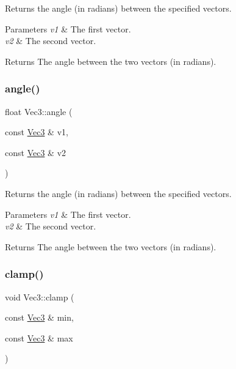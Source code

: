 Returns the angle (in radians) between the specified vectors.


\begin{DoxyParams}{Parameters}
{\em v1} & The first vector. \\
\hline
{\em v2} & The second vector.\\
\hline
\end{DoxyParams}
\begin{DoxyReturn}{Returns}
The angle between the two vectors (in radians). 
\end{DoxyReturn}
\mbox{\label{classVec3_a9172074a1ea39aee0863c1627a590d7b}} 
\subsubsection{\texorpdfstring{angle()}{angle()}\hspace{0.1cm}{\footnotesize\ttfamily [2/2]}}
{\footnotesize\ttfamily float Vec3\+::angle (\begin{DoxyParamCaption}\item[{const \hyperlink{classVec3}{Vec3} \&}]{v1,  }\item[{const \hyperlink{classVec3}{Vec3} \&}]{v2 }\end{DoxyParamCaption})\hspace{0.3cm}{\ttfamily [static]}}

Returns the angle (in radians) between the specified vectors.


\begin{DoxyParams}{Parameters}
{\em v1} & The first vector. \\
\hline
{\em v2} & The second vector.\\
\hline
\end{DoxyParams}
\begin{DoxyReturn}{Returns}
The angle between the two vectors (in radians). 
\end{DoxyReturn}
\mbox{\label{classVec3_a034818aeffd0dc22fd72dd8142687494}} 
\subsubsection{\texorpdfstring{clamp()}{clamp()}\hspace{0.1cm}{\footnotesize\ttfamily [1/4]}}
{\footnotesize\ttfamily void Vec3\+::clamp (\begin{DoxyParamCaption}\item[{const \hyperlink{classVec3}{Vec3} \&}]{min,  }\item[{const \hyperlink{classVec3}{Vec3} \&}]{max }\end{DoxyParamCaption})}

